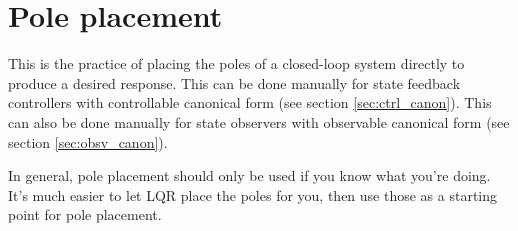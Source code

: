 \section{Pole placement}

This is the practice of placing the poles of a closed-loop \gls{system} directly
to produce a desired response. This can be done manually for state feedback
controllers with controllable canonical form (see section \ref{sec:ctrl_canon}).
This can also be done manually for \gls{state} \glspl{observer} with observable
canonical form (see section \ref{sec:obsv_canon}).

In general, pole placement should only be used if you know what you're doing.
It's much easier to let LQR place the poles for you, then use those as a
starting point for pole placement.
